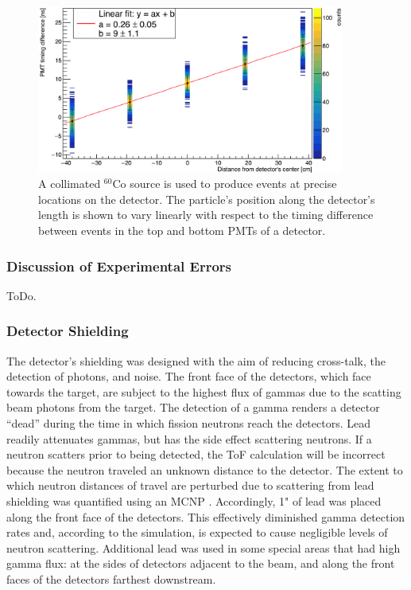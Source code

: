 \begin{figure}
    \centering
    \includegraphics[width = 0.9\textwidth]{Content/Methods/PMTDifference.png}
    \caption{A collimated $^{60}$Co source is used to produce events at precise locations on the detector.
    The particle's position along the detector's length is shown to vary linearly with respect to the timing difference between events in the top and bottom PMTs of a detector.}
    \label{fig:PMTDifference}
\end{figure}
\subsubsection{Discussion of Experimental Errors}
\label{Errors}
ToDo.

\subsubsection{Detector Shielding}

The detector's shielding was designed with the aim of reducing cross-talk, the detection of photons, and noise.
The front face of the detectors, which face towards the target, are subject to the highest flux of gammas due to the scatting beam photons from the target.
The detection of a gamma renders a detector ``dead'' during the time in which fission neutrons reach the detectors.
Lead readily attenuates gammas, but has the side effect scattering neutrons.
If a neutron scatters prior to being detected, the ToF calculation will be incorrect because the neutron traveled an unknown distance to the detector.
The extent to which neutron distances of travel are perturbed due to scattering from lead shielding was quantified using an MCNP .
Accordingly, 1" of lead was placed along the front face of the detectors.
This effectively diminished gamma detection rates and, according to the simulation, is expected to cause negligible levels of neutron scattering.
Additional lead was used in some special areas that had high gamma flux: at the sides of detectors adjacent to the beam, and along the front faces of the detectors farthest downstream.

